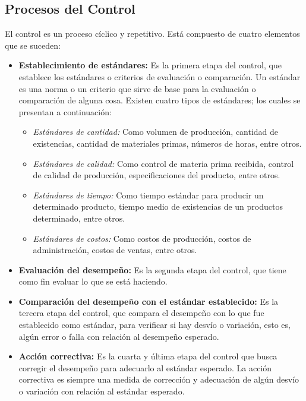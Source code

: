 \documentclass[12pt,letterpaper]{article}
\begin{document}
\subsection{Procesos del Control}
El control es un proceso cíclico y repetitivo. Está compuesto de cuatro elementos que se suceden:
\begin{itemize}
\item \textbf{Establecimiento de estándares:} Es la primera etapa del control, que establece los estándares o criterios de evaluación o comparación. Un estándar es una norma o un criterio que sirve de base para la evaluación o comparación de alguna cosa. Existen cuatro tipos de estándares; los cuales se presentan a continuación:
\begin{itemize}
\item \textit{Estándares de cantidad:} Como volumen de producción, cantidad de existencias, cantidad de materiales primas, números de horas, entre otros.
\item \textit{Estándares de calidad:} Como control de materia prima recibida, control de calidad de producción, especificaciones del producto, entre otros.
\item \textit{Estándares de tiempo:} Como tiempo estándar para producir un determinado producto, tiempo medio de existencias de un productos determinado, entre otros.
\item \textit{Estándares de costos:} Como costos de producción, costos de administración, costos de ventas, entre otros.
\end{itemize}
\item \textbf{Evaluación del desempeño:} Es la segunda etapa del control, que tiene como fin evaluar lo que se está haciendo.
\item \textbf{Comparación del desempeño con el estándar establecido:} Es la tercera etapa del control, que compara el desempeño con lo que fue establecido como estándar, para verificar si hay desvío o variación, esto es, algún error o falla con relación al desempeño esperado.
\item \textbf{Acción correctiva:} Es la cuarta y última etapa del control que busca corregir el desempeño para adecuarlo al estándar esperado. La acción correctiva es siempre una medida de corrección y adecuación de algún desvío o variación con relación al estándar esperado.
\end{itemize}
\end{document}
